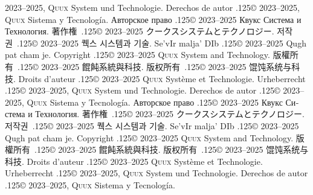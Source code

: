 \documentclass{cookbook}
\begin{document}
{{{	2023--2025, \textsc{Quux} System und Technologie.
Derechos de autor {\lower.125\baselineskip\hbox{\copyright}} %
	2023--2025, \textsc{Quux} Sistema y Tecnología.
\foreignlanguage{russian}{Авторское право} %
	{\lower.125\baselineskip\hbox{\copyright}}
	2023–2025 \foreignlanguage{russian}{Квукс Система и Технология.}
著作権~{\lower.125\baselineskip\hbox{\copyright}}
	2023--2025 クークスシステムとテクノロジー.
저작권~{\lower.125\baselineskip\hbox{\copyright}}
	2023--2025 퀙스 시스템과 기술.
Se'vIr malja' DIb {\lower.125\baselineskip\hbox{\copyright}} %
	2023--2025 Qugh pat cham je.
\ddag\texttt{{\gitabbrcommithash}}
Copyright {\lower.125\baselineskip\hbox{\copyright}}
	2023--2025 \textsc{Quux} System and Technology.
版權所有~{\lower.125\baselineskip\hbox{\copyright}}
	2023--2025 餛飩系統與科技.
版权所有~{\lower.125\baselineskip\hbox{\copyright}}
	2023--2025 馄饨系统与科技.
Droits d'auteur {\lower.125\baselineskip\hbox{\copyright}} %
	2023--2025 \textsc{Quux} Système et Technologie.
Urheberrecht {\lower.125\baselineskip\hbox{\copyright}} %
	2023--2025, \textsc{Quux} System und Technologie.
Derechos de autor {\lower.125\baselineskip\hbox{\copyright}} %
	2023--2025, \textsc{Quux} Sistema y Tecnología.
\foreignlanguage{russian}{Авторское право} %
	{\lower.125\baselineskip\hbox{\copyright}}
	2023–2025 \foreignlanguage{russian}{Квукс Система и Технология.}
著作権~{\lower.125\baselineskip\hbox{\copyright}}
	2023--2025 クークスシステムとテクノロジー.
저작권~{\lower.125\baselineskip\hbox{\copyright}}
	2023--2025 퀙스 시스템과 기술.
Se'vIr malja' DIb {\lower.125\baselineskip\hbox{\copyright}} %
	2023--2025 Qugh pat cham je.
\texttt{{\gitabbrcommithash}}
Copyright {\lower.125\baselineskip\hbox{\copyright}}
	2023--2025 \textsc{Quux} System and Technology.
版權所有~{\lower.125\baselineskip\hbox{\copyright}}
	2023--2025 餛飩系統與科技.
版权所有~{\lower.125\baselineskip\hbox{\copyright}}
	2023--2025 馄饨系统与科技.
Droits d'auteur {\lower.125\baselineskip\hbox{\copyright}} %
	2023--2025 \textsc{Quux} Système et Technologie.
Urheberrecht {\lower.125\baselineskip\hbox{\copyright}} %
	2023--2025, \textsc{Quux} System und Technologie.
Derechos de autor {\lower.125\baselineskip\hbox{\copyright}} %
	2023--2025, \textsc{Quux} Sistema y Tecnología.
}}}
\end{document}
